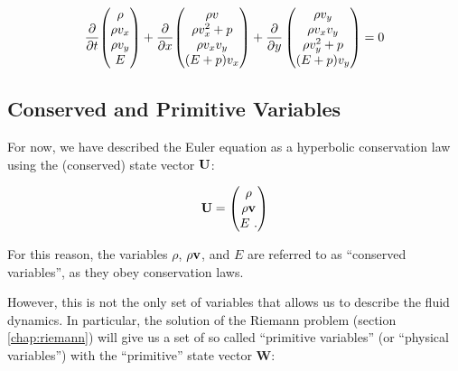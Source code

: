 \begin{align}
	\frac{\partial}{\partial t}{ 
		\begin{pmatrix}
			\rho \\ \rho v_x \\ \rho v_y \\ E
		\end{pmatrix}
		}
	+ \frac{\partial}{\partial x} {
		\begin{pmatrix}
			\rho v\\
			\rho v_x^2  + p\\
			\rho v_x v_y\\
			(E + p) v_x
		\end{pmatrix}
	} 
	+ \frac{\partial}{\partial y}
		\begin{pmatrix}
			\rho v_y\\
			\rho v_x v_y\\
			\rho v_y^2  + p\\
			(E + p) v_y
		\end{pmatrix}
	= 0
\end{align}















\subsection{Conserved and Primitive Variables}


For now, we have described the Euler equation as a hyperbolic conservation law
using the (conserved) state vector $\mathbf{U}$:

\begin{align}
	\mathbf{U} = 
		\begin{pmatrix}
			\rho \\ \rho \mathbf{v} \\ E \ .
		\end{pmatrix}
\end{align}


For this reason, the variables $\rho$, $\rho \mathbf{v}$, and $E$ are referred to as
``conserved variables'', as they obey conservation laws.

However, this is not the only set of variables that allows us to describe the
fluid dynamics. In particular, the solution of the  Riemann problem (section
\ref{chap:riemann}) will give us a set of so called ``primitive
variables'' (or ``physical variables'') with the ``primitive'' state vector
$\mathbf{W}$:

